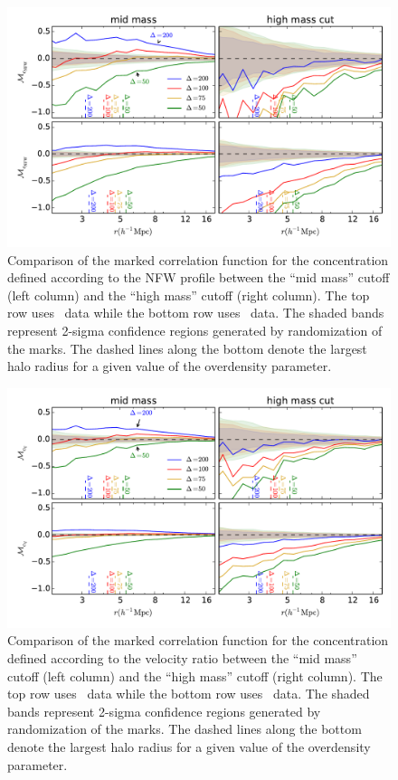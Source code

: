 \documentclass[usenatbib,usegraphicx,letterpaper]{mn2e}
\begin{document}
\begin{figure}
	\centering
	\includegraphics[width=.9\textwidth]{all_mcf_cnfw_z00_hostsvhigh.pdf}
	\caption{Comparison of the marked correlation function for the concentration defined according to the NFW profile between the ``mid mass'' cutoff (left column) and the ``high mass'' cutoff (right column). The top row uses \simB \ data while the bottom row uses \simC \ data. The shaded bands represent 2-sigma confidence regions generated by randomization of the marks. The dashed lines along the bottom denote the largest halo radius for a given value of the overdensity parameter.}
	\label{fig:hvh_mcf_cnfw}
\end{figure}

\begin{figure}
	\centering
	\includegraphics[width=.9\textwidth]{all_mcf_cV_z00_hostsvhigh.pdf}
	\caption{Comparison of the marked correlation function for the concentration defined according to the velocity ratio between the ``mid mass'' cutoff (left column) and the ``high mass'' cutoff (right column). The top row uses \simB \ data while the bottom row uses \simC \ data. The shaded bands represent 2-sigma confidence regions generated by randomization of the marks. The dashed lines along the bottom denote the largest halo radius for a given value of the overdensity parameter.}
	\label{fig:hvh_mcf_cV}
\end{figure}
\end{document}
